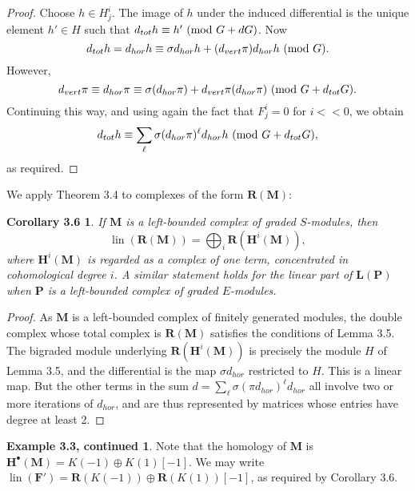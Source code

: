 \documentclass{tran-l}
\newcommand{\lin}{\operatorname{lin}}
\newcommand{\FF}{\mathbf{F}}
\newcommand{\myH}{\mathbf{H}}
\newcommand{\LL}{\mathbf{L}}
\newcommand{\MM}{\mathbf{M}}
\newcommand{\PP}{\mathbf{P}}
\newcommand{\RR}{\mathbf{R}}
\theoremstyle{plain}
\newtheorem*{theorem14}{Corollary 3.6}
\theoremstyle{remark}
\theoremstyle{definition}
\newtheorem*{definition2}{Example 3.3, continued}
\begin{document}
\begin{proof}
Choose $h\in H^{i}_{j}$. The image of $h$ under the induced
differential is the unique element $h'\in H$ such that
$d_{tot}h\equiv h'\ (\hbox {mod }G+dG)$.
Now
\begin{equation*}d_{tot}h
=d_{hor}h
\equiv \sigma d_{hor} h + (d_{vert}\pi ) d_{hor} h\ (\hbox {mod }G).
\end{equation*}
However,
\begin{equation*}d_{vert}\pi \equiv d_{hor}\pi \equiv \sigma (d_{hor}\pi ) + d_{vert}\pi (d_{hor}\pi )
\ (\hbox {mod }G+d_{tot}G).
\end{equation*}
Continuing this way, and using again the fact that $F^{i}_{j}=0$ for
$i<<0$, we obtain
\begin{equation*}d_{tot}h
\equiv \sum _{\ell }\sigma (d_{hor}\pi )^{\ell }d_{hor}h
\ (\hbox {mod }G+d_{tot}G),
\end{equation*}
as required.
\end{proof}


We apply Theorem 3.4 to complexes of the form
$\RR (\MM )$:
\begin{theorem14}
If $\MM $ is a left-bounded
complex of graded $S$-modules,
then
\begin{equation*}\lin (\RR (\MM ))=\bigoplus _{i}\RR (\myH ^{i}(\MM )),
\end{equation*}
where $\myH ^{i}(\MM )$ is regarded as a complex of one term, concentrated
in cohomological degree $i$. A similar statement holds for
the linear part of $\LL (\PP )$ when $\PP $ is a left-bounded
complex of graded $E$-modules.
\end{theorem14}
\begin{proof}  As $\MM $ is a left-bounded complex of finitely generated
modules, the double complex  whose total complex is $\RR (\MM )$
satisfies the conditions of Lemma 3.5. The
bigraded module underlying
$\RR (\myH ^{i}(\MM ))$ is precisely the module $H$ of
Lemma 3.5,
and the differential is the map $\sigma d_{hor}$ restricted to $H$.
This is a linear map. But the other terms in the sum
$d=\sum _{\ell }\sigma (\pi d_{hor})^{\ell }d_{hor}$ all involve two or
more iterations of $d_{hor}$, and are thus represented by matrices
whose entries have degree at least 2.
\end{proof}
\begin{definition2}
Note that the homology of $\MM $ is
$\myH ^{\bullet }(\MM )=K(-1)\oplus K(1)[-1]$.
We may write
$\lin (\FF ')=\RR (K(-1))\oplus \RR (K(1))[-1]$,
as required by Corollary 3.6.
\end{definition2}
\end{document}
